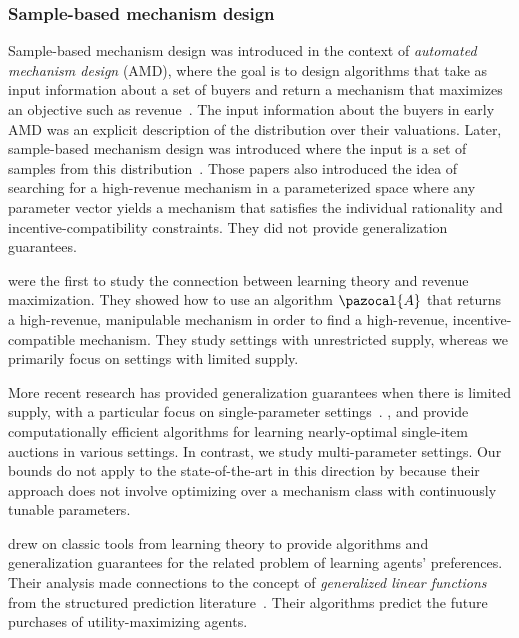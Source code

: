 \subsubsection{Sample-based mechanism design}
Sample-based mechanism design was introduced in the context of \emph{automated mechanism design}
(AMD), where the goal is to design algorithms that take as input information about a set of buyers
and return a mechanism that maximizes an objective such as revenue~\citep{Conitzer02:Mechanism,Sandholm03:Automated,Conitzer04:Self}. The input information about the buyers in early AMD was an explicit description of the distribution over their valuations. Later, sample-based mechanism design was introduced where the input is a set of samples from this distribution~\citep{Likhodedov04:Boosting,Likhodedov05:Approximating,Sandholm15:Automated}. Those papers also introduced the idea of searching for a high-revenue mechanism in a parameterized space where any parameter vector yields a mechanism that satisfies the individual rationality and incentive-compatibility constraints. They did not provide generalization guarantees.

\citet{Balcan05:Mechanism, Balcan08:Reducing} were the first to study the connection between learning theory and revenue maximization. They showed how to use an algorithm $\pazocal{A}$ that returns a high-revenue, manipulable mechanism in order to find a high-revenue, incentive-compatible mechanism. They study settings with unrestricted supply, whereas we primarily focus on settings with limited supply.
	
	More recent research has provided generalization guarantees when there is limited supply, with a particular focus on single-parameter settings~\citep{Alon17:Submultiplicative, Elkind07:Designing,Cole14:Sample, Huang15:Making, Mohri14:Learning, Morgenstern15:Pseudo, Roughgarden15:Ironing, Bubeck17:Online, Chawla14:Mechanism}.  \citet{Devanur16:Sample,Gonczarowski17:Efficient,Guo19:Settling}, and \citet{Hartline16:Non} provide computationally efficient algorithms for learning nearly-optimal single-item auctions in various settings. In contrast, we study multi-parameter settings. Our bounds do not apply to the state-of-the-art in this direction by \citet{Guo19:Settling} because their approach does not involve optimizing over a mechanism class with continuously tunable parameters.

\citet{Balcan14:Learning} drew on classic tools from learning theory to provide algorithms and generalization guarantees for the related problem of learning agents' preferences. Their analysis made connections to the concept of \emph{generalized linear functions} from the structured prediction literature~\citep{Collins00:Discriminative}. Their algorithms predict the future purchases of utility-maximizing agents.


